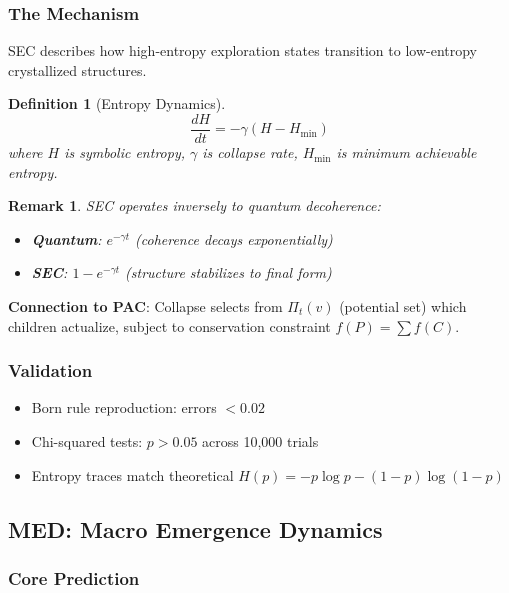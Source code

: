 \documentclass[11pt,a4paper]{article}
\newtheorem{definition}{Definition}
\newtheorem{remark}{Remark}
\begin{document}
\subsubsection{The Mechanism}

SEC describes how high-entropy exploration states transition to low-entropy crystallized structures.

\begin{definition}[Entropy Dynamics]
\begin{equation}
\frac{dH}{dt} = -\gamma(H - H_{\min})
\end{equation}
where $H$ is symbolic entropy, $\gamma$ is collapse rate, $H_{\min}$ is minimum achievable entropy.
\end{definition}

\begin{remark}
SEC operates \emph{inversely} to quantum decoherence:
\begin{itemize}
    \item \textbf{Quantum}: $e^{-\gamma t}$ (coherence decays exponentially)
    \item \textbf{SEC}: $1 - e^{-\gamma t}$ (structure stabilizes to final form)
\end{itemize}
\end{remark}

\textbf{Connection to PAC}: Collapse selects from $\Pi_t(v)$ (potential set) which children actualize, subject to conservation constraint $f(P) = \sum f(C)$.

\subsubsection{Validation}

\begin{itemize}
    \item Born rule reproduction: errors $< 0.02$
    \item Chi-squared tests: $p > 0.05$ across 10,000 trials
    \item Entropy traces match theoretical $H(p) = -p \log p - (1-p) \log(1-p)$
\end{itemize}

\subsection{MED: Macro Emergence Dynamics}

\subsubsection{Core Prediction}
\end{document}
